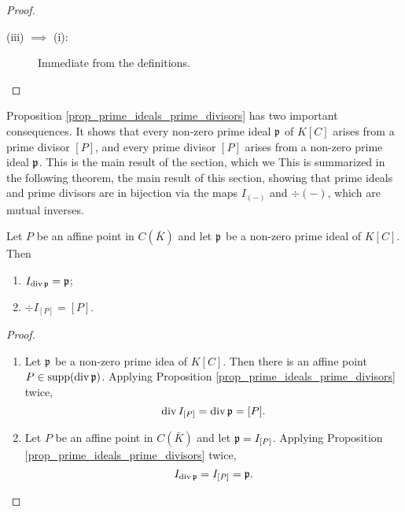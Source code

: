 \begin{proof}
\begin{description}
\begin{comment}
      Conversely, if $Q$ is not in the orbit of $P$, then $\frak p \neq I_{[Q]}$,
      so that $Q \not \in \supp(\div \frak p)$.
      By Lemma \ref{lem_order_is_1}, $P$ appears with multiplicity 1, so that $\div \frak p = [P]$.
\end{comment}
    \item [(iii) $\implies$ (i):]
      Immediate from the definitions.\qedhere
  \end{description}
\end{proof}

Proposition \ref{prop_prime_ideals_prime_divisors} has two important consequences.
It shows that every non-zero prime ideal $\frak p$ of $K[C]$ arises from a prime divisor $[P]$,
and every prime divisor $[P]$ arises from a non-zero prime ideal $\frak p$.
This is the main result of the section,
which we 
This is summarized in the following theorem, the main result of this section,
showing that prime ideals and prime divisors are in bijection
via the maps $I_{(-)}$ and $\div(-)$, which are mutual inverses.

\begin{theorem}
  Let $P$ be an affine point in $C(\bar K)$ and let $\frak p$ be a non-zero prime ideal of $K[C]$. Then
  \begin{enumerate}[label=(\roman*)]
    \item $I_{\div \frak p} = \frak p$;
    \item $\div I_{[P]} = [P]$.
  \end{enumerate}
\end{theorem}
\begin{proof}
  \begin{enumerate}[label=(\roman*)]
    \item
      Let $\frak p$ be a non-zero prime idea of $K[C]$.
      Then there is an affine point $P \in \supp(\div \frak p)$.
      Applying Proposition \ref{prop_prime_ideals_prime_divisors} twice,
      \[ \div I_{[P]} = \div \frak p = [P]. \]
    
    \item
      Let $P$ be an affine point in $C(\bar K)$ and let $\frak p = I_{[P]}$.
      Applying Proposition \ref{prop_prime_ideals_prime_divisors} twice,
      \[ I_{\div \frak p} = I_{[P]} = \frak p. \]
  \end{enumerate}
\end{proof}




